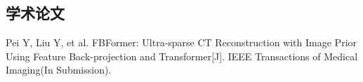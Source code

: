 
\begin{achievements}

\subsection*{学术论文}

\begin{bibliolist}{00}
  \item Pei Y, Liu Y, et al. FBFormer: Ultra-sparse CT Reconstruction with Image Prior Using Feature Back-projection and Transformer[J]. IEEE Transactions of Medical Imaging(In Submission).
\end{bibliolist}

\end{achievements}
